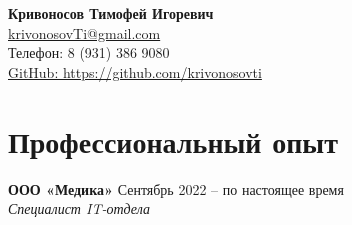 \documentclass[a4paper,10pt]{article}
\begin{document}
\pagestyle{empty}

\begin{center}
    {\LARGE \textbf{Кривоносов Тимофей Игоревич}}\\
    \vspace{0.2cm}
    \href{mailto:[Ваш email]}{krivonosovTi@gmail.com} \\
    Телефон: 8 (931) 386 9080 \\
    \href{https://github.com/krivonosovti}{GitHub: https://github.com/krivonosovti} \\
\end{center}

\vspace{0.5cm}

\section*{Профессиональный опыт}

\textbf{ООО «Медика»} \hfill Сентябрь 2022 – по настоящее время \\
\textit{Специалист IT-отдела} \\
\end{document}
